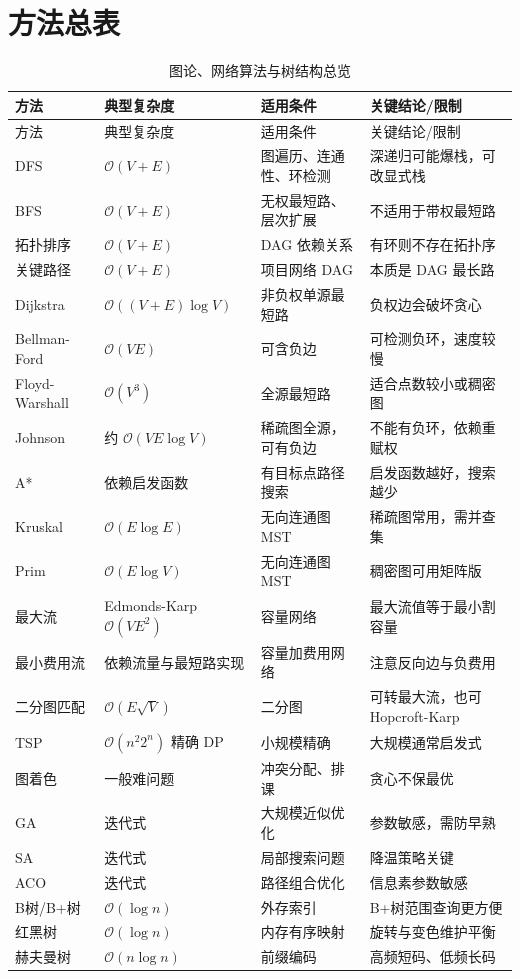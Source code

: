 \documentclass[UTF8,oneside,12pt]{ctexbook}
\newcommand{\bigO}{\mathcal O}
\begin{document}
\section{方法总表}
\begin{longtable}{p{2.7cm}p{3.2cm}p{3.3cm}p{4.7cm}}
\caption{图论、网络算法与树结构总览}\\
\toprule
方法 & 典型复杂度 & 适用条件 & 关键结论/限制 \\
\midrule
\endfirsthead
\toprule
方法 & 典型复杂度 & 适用条件 & 关键结论/限制 \\
\midrule
\endhead
DFS & $\bigO(V+E)$ & 图遍历、连通性、环检测 & 深递归可能爆栈，可改显式栈 \\
BFS & $\bigO(V+E)$ & 无权最短路、层次扩展 & 不适用于带权最短路 \\
拓扑排序 & $\bigO(V+E)$ & DAG 依赖关系 & 有环则不存在拓扑序 \\
关键路径 & $\bigO(V+E)$ & 项目网络 DAG & 本质是 DAG 最长路 \\
Dijkstra & $\bigO((V+E)\log V)$ & 非负权单源最短路 & 负权边会破坏贪心 \\
Bellman-Ford & $\bigO(VE)$ & 可含负边 & 可检测负环，速度较慢 \\
Floyd-Warshall & $\bigO(V^3)$ & 全源最短路 & 适合点数较小或稠密图 \\
Johnson & 约 $\bigO(VE\log V)$ & 稀疏图全源，可有负边 & 不能有负环，依赖重赋权 \\
A* & 依赖启发函数 & 有目标点路径搜索 & 启发函数越好，搜索越少 \\
Kruskal & $\bigO(E\log E)$ & 无向连通图 MST & 稀疏图常用，需并查集 \\
Prim & $\bigO(E\log V)$ & 无向连通图 MST & 稠密图可用矩阵版 \\
最大流 & Edmonds-Karp $\bigO(VE^2)$ & 容量网络 & 最大流值等于最小割容量 \\
最小费用流 & 依赖流量与最短路实现 & 容量加费用网络 & 注意反向边与负费用 \\
二分图匹配 & $\bigO(E\sqrt V)$ & 二分图 & 可转最大流，也可 Hopcroft-Karp \\
TSP & $\bigO(n^2 2^n)$ 精确 DP & 小规模精确 & 大规模通常启发式 \\
图着色 & 一般难问题 & 冲突分配、排课 & 贪心不保最优 \\
GA & 迭代式 & 大规模近似优化 & 参数敏感，需防早熟 \\
SA & 迭代式 & 局部搜索问题 & 降温策略关键 \\
ACO & 迭代式 & 路径组合优化 & 信息素参数敏感 \\
B树/B+树 & $\bigO(\log n)$ & 外存索引 & B+树范围查询更方便 \\
红黑树 & $\bigO(\log n)$ & 内存有序映射 & 旋转与变色维护平衡 \\
赫夫曼树 & $\bigO(n\log n)$ & 前缀编码 & 高频短码、低频长码 \\
\bottomrule
\end{longtable}
\end{document}
